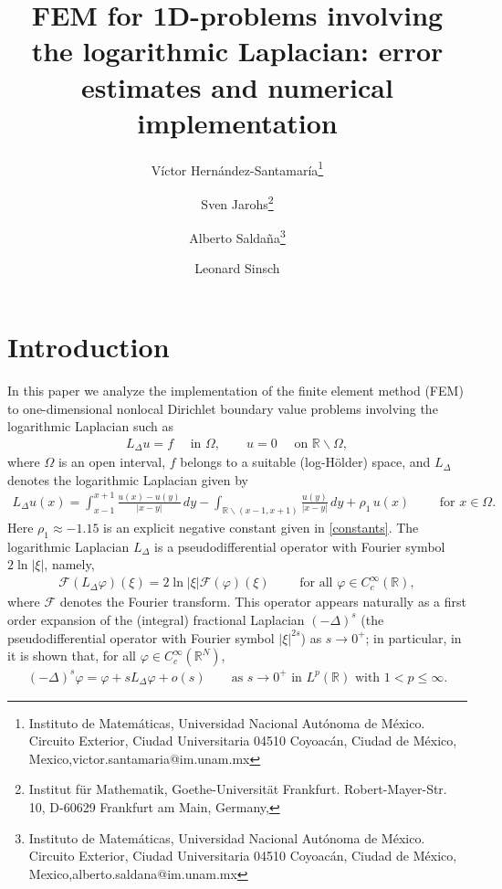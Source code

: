 \documentclass[10 pt]{article}
\title{FEM for 1D-problems involving the logarithmic Laplacian: error estimates and numerical implementation}
\author{V\'ictor Hern\'andez-Santamar\'ia\footnote{Instituto de Matem\'aticas,
Universidad Nacional Aut\'onoma de M\'exico. 
Circuito Exterior, Ciudad Universitaria
04510 Coyoac\'an, Ciudad de M\'exico, Mexico,\newline victor.santamaria@im.unam.mx}\and
Sven Jarohs\footnote{Institut f\"ur Mathematik,
Goethe-Universit\"at Frankfurt.
Robert-Mayer-Str. 10,
D-60629 Frankfurt am Main, Germany, }\and
Alberto Salda\~{n}a\footnote{Instituto de Matem\'aticas,
Universidad Nacional Aut\'onoma de M\'exico. 
Circuito Exterior, Ciudad Universitaria
04510 Coyoac\'an, Ciudad de M\'exico, Mexico,\newline alberto.saldana@im.unam.mx}\and  
Leonard Sinsch 
}
\numberwithin{equation}{section}
\def\R{\mathbb{R}}
\begin{document}
\maketitle

\section{Introduction}

In this paper we analyze the implementation of the finite element method (FEM) to one-dimensional nonlocal Dirichlet boundary value problems involving the logarithmic Laplacian such as
\begin{align}\label{P:intro}
    L_\Delta u = f \quad \text{ in }\Omega,\qquad u=0\quad \text{ on }\R\backslash \Omega,
\end{align}
where $\Omega$ is an open interval, $f$ belongs to a suitable (log-Hölder) space, and $L_\Delta$ denotes the logarithmic Laplacian given by
\begin{align}\label{LL}
     L_\Delta u(x)
     =
     \int_{x-1}^{x+1}\frac{u(x)-u(y)}{|x-y|}\, dy
     -\int_{\R\backslash(x-1,x+1)}\frac{u(y)}{|x-y|}\, dy
     +\rho_1\, u(x)\qquad \text{ for }x\in \Omega.
 \end{align}
 Here $\rho_1\approx-1.15$ is an explicit negative constant given in \eqref{constants}. The logarithmic Laplacian $L_\Delta$ is a pseudodifferential operator with Fourier symbol $2\ln|\xi|$, namely,
\begin{align*}
{\mathcal F}(L_\Delta \varphi)(\xi)=2\ln|\xi| {\mathcal F}(\varphi)(\xi)\qquad \text{ for all }\varphi\in C^\infty_c(\R),
\end{align*}
where ${\mathcal F}$ denotes the Fourier transform.  This operator appears naturally as a first order expansion of the (integral) fractional Laplacian $(-\Delta)^s$ (the pseudodifferential operator with Fourier symbol $|\xi|^{2s}$) as $s\to 0^+$; in particular, in \cite[Theorem 1.1]{CW19} it is shown that, for all $\varphi\in C^\infty_c(\R^N)$,
\begin{align}\label{intro:exp}
(-\Delta)^s\varphi = \varphi + sL_\Delta \varphi + o(s)\qquad \text{as $s\to 0^+$ in }L^p(\R) \text{ with }1<p\leq \infty.
\end{align}
\end{document}

